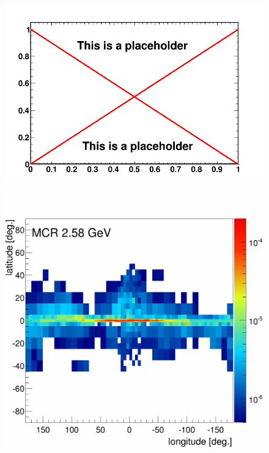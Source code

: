 


\begin{figure}[h]
  \centering
  \begin{minipage}[h]{0.45\textwidth}
  	\centering
	\includegraphics[width=1.\linewidth]{pic/dummy.png}
  	\label{fig:CO_skymap}
  \end{minipage}
  \hfill
  \begin{minipage}[h]{0.45\textwidth}
  	\centering
	\includegraphics[width=1.\linewidth]{pic/results/MCRonly_MCR_fluxE12_skymap.png}

\end{minipage}
\end{figure}
